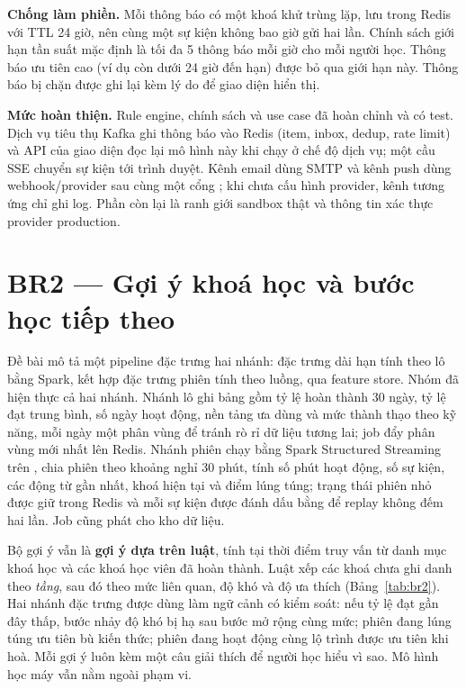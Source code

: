 \textbf{Chống làm phiền.} Mỗi thông báo có một khoá khử trùng lặp, lưu trong Redis với TTL 24 giờ, nên cùng một sự kiện không bao giờ gửi hai lần. Chính sách giới hạn tần suất mặc định là tối đa 5 thông báo mỗi giờ cho mỗi người học. Thông báo ưu tiên cao (ví dụ còn dưới 24 giờ đến hạn) được bỏ qua giới hạn này. Thông báo bị chặn được ghi lại kèm lý do để giao diện hiển thị.

\textbf{Mức hoàn thiện.} Rule engine, chính sách và use case đã hoàn chỉnh và có test. Dịch vụ tiêu thụ Kafka ghi thông báo vào Redis (item, inbox, dedup, rate limit) và API của giao diện đọc lại mô hình này khi chạy ở chế độ dịch vụ; một cầu SSE chuyển sự kiện  tới trình duyệt. Kênh email dùng SMTP và kênh push dùng webhook/provider sau cùng một cổng ; khi chưa cấu hình provider, kênh tương ứng chỉ ghi log. Phần còn lại là ranh giới sandbox thật và thông tin xác thực provider production.

\section{BR2 --- Gợi ý khoá học và bước học tiếp theo}
\label{sec:br2}

Đề bài mô tả một pipeline đặc trưng hai nhánh: đặc trưng dài hạn tính theo lô bằng Spark, kết hợp đặc trưng phiên tính theo luồng, qua feature store. Nhóm đã hiện thực cả hai nhánh. Nhánh lô ghi bảng  gồm tỷ lệ hoàn thành 30 ngày, tỷ lệ đạt trung bình, số ngày hoạt động, nền tảng ưa dùng và mức thành thạo theo kỹ năng, mỗi ngày một phân vùng để tránh rò rỉ dữ liệu tương lai; job  đẩy phân vùng mới nhất lên Redis. Nhánh phiên chạy bằng Spark Structured Streaming trên , chia phiên theo khoảng nghỉ 30 phút, tính số phút hoạt động, số sự kiện, các động từ gần nhất, khoá hiện tại và điểm lúng túng; trạng thái phiên nhỏ được giữ trong Redis và mỗi sự kiện được đánh dấu bằng  để replay không đếm hai lần. Job cũng phát  cho kho dữ liệu.

Bộ gợi ý vẫn là \textbf{gợi ý dựa trên luật}, tính tại thời điểm truy vấn từ danh mục khoá học và các khoá học viên đã hoàn thành. Luật xếp các khoá chưa ghi danh theo \emph{tầng}, sau đó theo mức liên quan, độ khó và độ ưa thích (Bảng~\ref{tab:br2}). Hai nhánh đặc trưng được dùng làm ngữ cảnh có kiểm soát: nếu tỷ lệ đạt gần đây thấp, bước nhảy độ khó bị hạ sau bước mở rộng cùng mức; phiên đang lúng túng ưu tiên bù kiến thức; phiên đang hoạt động cùng lộ trình được ưu tiên khi hoà. Mỗi gợi ý luôn kèm một câu giải thích để người học hiểu vì sao. Mô hình học máy vẫn nằm ngoài phạm vi.


